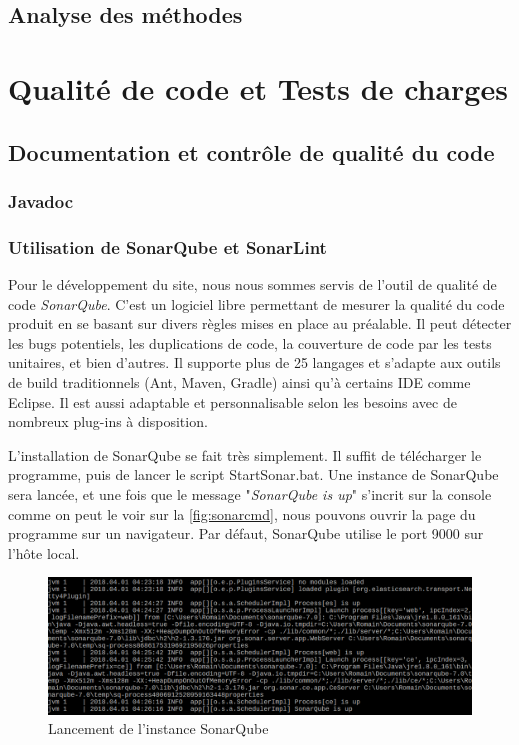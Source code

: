 \documentclass{polytech/polytech}
\begin{document}
\chapter{Analyse des méthodes}



\part{Qualité de code et Tests de charges}


\chapter{Documentation et contrôle de qualité du code}


\section{Javadoc}


\section{Utilisation de SonarQube et SonarLint}

Pour le développement du site, nous nous sommes servis de l'outil de qualité de code \textit{SonarQube}. C'est un logiciel libre permettant de mesurer la qualité du code produit en se basant sur divers règles mises en place au préalable. Il peut détecter les bugs potentiels, les duplications de code, la couverture de code par les tests unitaires, et bien d'autres. Il supporte plus de 25 langages et s'adapte aux outils de build traditionnels (Ant, Maven, Gradle) ainsi qu'à certains IDE comme Eclipse. Il est aussi adaptable et personnalisable selon les besoins avec de nombreux plug-ins à disposition.

L'installation de SonarQube se fait très simplement. Il suffit de télécharger le programme, puis de lancer le script StartSonar.bat. Une instance de SonarQube sera lancée, et une fois que le message "\textit{SonarQube is up}" s'incrit sur la console comme on peut le voir sur la \autoref{fig:sonarcmd}, nous pouvons ouvrir la page du programme sur un navigateur. Par défaut, SonarQube utilise le port 9000 sur l'hôte local.


\begin{figure}
	\includegraphics[scale=0.6]{sonarcmd.png}
	\caption{Lancement de l'instance SonarQube}
	\label{fig:sonarcmd}
\end{figure}
\end{document}
